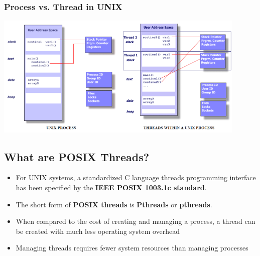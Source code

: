 \subsubsection{Process vs. Thread in UNIX}
\includegraphics[width=12cm]{images/Concurrency/ProcessVsThread.png}

\subsection{What are POSIX Threads?}
\begin{itemize}
    \item For UNIX systems, a standardized C language threads programming interface has been specified by the \textbf{IEEE POSIX 1003.1c standard}.
    \item The short form of \textbf{POSIX threads} is \textbf{Pthreads} or \textbf{pthreads}.
    \item When compared to the cost of creating and managing a process, a thread can be created with much less operating system overhead
    \item Managing threads requires fewer system resources than managing processes
\end{itemize}

